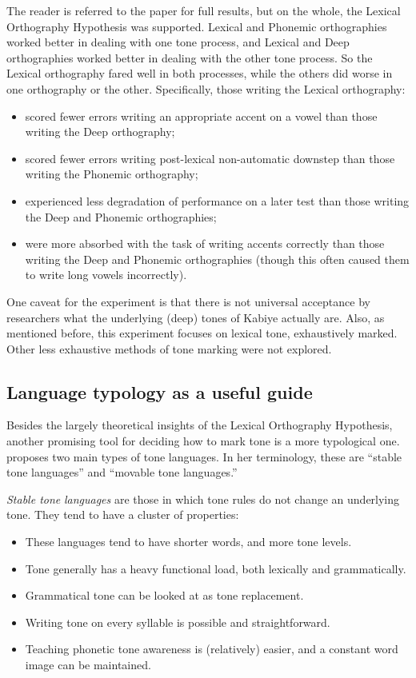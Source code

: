 \documentclass[output=paper]{langscibook}
\begin{document}
The reader is referred to the paper for full results, but on the whole, the Lexical Orthography Hypothesis was supported. Lexical and Phonemic orthographies worked better in dealing with one tone process, and Lexical and Deep orthographies worked better in dealing with the other tone process. So the Lexical orthography fared well in both processes, while the others did worse in one orthography or the other. Specifically, those writing the Lexical orthography:

\begin{itemize}
    \item scored fewer errors writing an appropriate accent on a vowel than those writing the Deep orthography;
    \item scored fewer errors writing post-lexical non-automatic downstep than those writing the Phonemic orthography;
    \item experienced less degradation of performance on a later test than those writing the Deep and Phonemic orthographies;
    \item were more absorbed with the task of writing accents correctly than those writing the Deep and Phonemic orthographies (though this often caused them to write long vowels incorrectly).
\end{itemize}

One caveat for the experiment is that there is not universal acceptance by researchers what the underlying (deep) tones of Kabiye actually are. Also, as mentioned before, this experiment focuses on lexical tone, exhaustively marked. Other less exhaustive methods of tone marking were not explored.

\subsection{Language typology as a useful guide}
\label{sec:PhonTheoryOrtho:LanguageTypo:2}

Besides the largely theoretical insights of the Lexical Orthography Hypothesis, another promising tool for deciding how to mark tone is a more typological one. \citet{Kutsch2014} proposes two main types of tone languages. In her terminology, these are “stable tone languages” and “movable tone languages.”

\textit{Stable tone} \textit{languages} are those in which tone rules do not change an underlying tone. They tend to have a cluster of properties:

\begin{itemize}

    \item These languages tend to have shorter words, and more tone levels. 
    \item Tone generally has a heavy functional load, both lexically and grammatically. 
    \item Grammatical tone can be looked at as tone replacement. 
    \item Writing tone on every syllable is possible and straightforward. 
    \item Teaching phonetic tone awareness is (relatively) easier, and a constant word image can be maintained.
\end{itemize}
\end{document}
